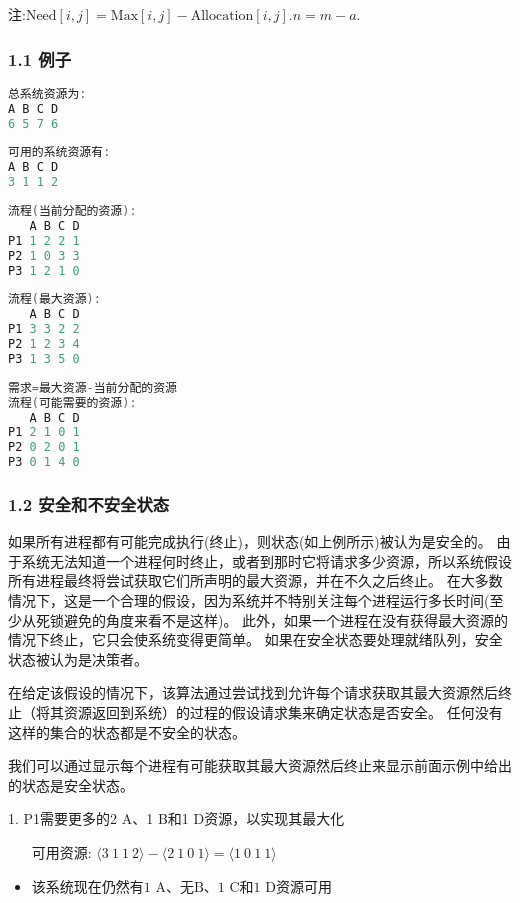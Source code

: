 注:$\text{Need}[i, j] = \text{Max}[i, j] - \text{Allocation}[i, j].n=m-a.$
\subsubsection{1.1 例子}
\begin{lstlisting}[language=cpp]
总系统资源为:
A B C D
6 5 7 6
\end{lstlisting}
\begin{lstlisting}[language=cpp]
可用的系统资源有:
A B C D
3 1 1 2
\end{lstlisting}
\begin{lstlisting}[language=cpp]
流程(当前分配的资源):
   A B C D
P1 1 2 2 1
P2 1 0 3 3
P3 1 2 1 0
\end{lstlisting}
\begin{lstlisting}[language=cpp]
流程(最大资源):
   A B C D
P1 3 3 2 2
P2 1 2 3 4
P3 1 3 5 0
\end{lstlisting}
\begin{lstlisting}[language=cpp]
需求=最大资源-当前分配的资源
流程(可能需要的资源):
   A B C D
P1 2 1 0 1
P2 0 2 0 1
P3 0 1 4 0
\end{lstlisting}
\subsubsection{1.2 安全和不安全状态}
如果所有进程都有可能完成执行(终止)，则状态(如上例所示)被认为是安全的。 由于系统无法知道一个进程何时终止，或者到那时它将请求多少资源，所以系统假设所有进程最终将尝试获取它们所声明的最大资源，并在不久之后终止。 在大多数情况下，这是一个合理的假设，因为系统并不特别关注每个进程运行多长时间(至少从死锁避免的角度来看不是这样)。 此外，如果一个进程在没有获得最大资源的情况下终止，它只会使系统变得更简单。 如果在安全状态要处理就绪队列，安全状态被认为是决策者。

在给定该假设的情况下，该算法通过尝试找到允许每个请求获取其最大资源然后终止（将其资源返回到系统）的过程的假设请求集来确定状态是否安全。 任何没有这样的集合的状态都是不安全的状态。

我们可以通过显示每个进程有可能获取其最大资源然后终止来显示前面示例中给出的状态是安全状态。

1. P1需要更多的2 A、1 B和1 D资源，以实现其最大化
    \begin{itemize}
        \item [可用资源: $\langle 3\ 1\ 1\ 2\rangle - \langle 2\ 1\ 0\ 1\rangle = \langle 1\ 0\ 1\ 1\rangle$]
        \item $\text{该系统现在仍然有1 A、无B、1 C和1 D资源可用}$
    \end{itemize}


